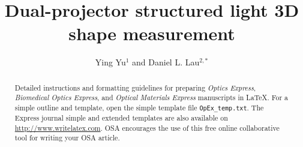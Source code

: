 \documentclass[10pt,letterpaper]{article}
\begin{document}
\title{Dual-projector structured light 3D shape measurement}

\author{Ying Yu$^1$ and Daniel L. Lau$^{2,*}$}

\address{$^1$Department of Electrical and Computer Engineering, University of Kentucky, Lexington, KY, 40506, USA\\
$^2$Department of Electrical and Computer Engineering, University of Kentucky, Lexington, KY, 40506, USA}




\begin{abstract}
Detailed instructions and formatting guidelines for preparing \textit{Optics Express}, \textit{Biomedical Optics Express}, and \textit{Optical Materials Express} manuscripts in \LaTeX. For a simple outline and template, open the simple template file \texttt{OpEx\_temp.txt}. The Express journal simple and extended templates are also available on \url{http://www.writelatex.com}. OSA encourages the use of this free online collaborative tool for writing your OSA article.
\end{abstract}

\end{document}

